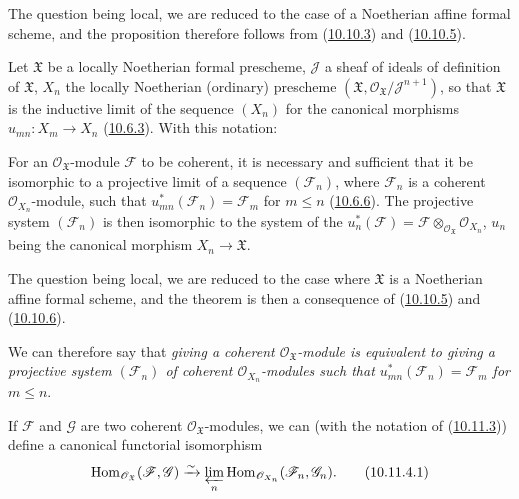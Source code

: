 The question being local, we are reduced to the case of a Noetherian
affine formal scheme, and the proposition therefore follows from
(\hyperref[I.10.10.3]{10.10.3}) and
(\hyperref[I.10.10.5]{10.10.5}).

\begin{env}[10.11.2]
\label{I.10.11.2}
Let $\mathfrak{X}$ be a locally Noetherian formal prescheme,
$\mathscr{J}$ a sheaf of ideals of definition of $\mathfrak{X}$,
$X_n$ the locally Noetherian (ordinary) prescheme
$(\mathfrak{X},\mathscr{O}_{\mathfrak{X}}/\mathscr{J}^{n+1})$, so
that $\mathfrak{X}$ is the inductive limit of the sequence $(X_n)$ for
the canonical morphisms $u_{mn}:X_m\to X_n$
(\hyperref[I.10.6.3]{10.6.3}). With this notation:
\end{env}

\begin{theorem}[10.11.3]
\label{I.10.11.3}
For an $\mathscr{O}_{\mathfrak{X}}$-module $\mathscr{F}$ to be
coherent, it is necessary and sufficient that it be isomorphic to a
projective limit of a sequence $(\mathscr{F}_n)$, where $\mathscr{F}_n$ is a
coherent $\mathscr{O}_{X_n}$-module, such that
$u_{mn}^*(\mathscr{F}_n)=\mathscr{F}_m$ for $m\leq n$
(\hyperref[I.10.6.6]{10.6.6}). The projective system
$(\mathscr{F}_n)$ is then isomorphic to the system of the
$u_n^*(\mathscr{F})=\mathscr{F}
\otimes_{\mathscr{O}_{\mathfrak{X}}}\mathscr{O}_{X_n}$, $u_n$ being
the canonical morphism $X_n\to\mathfrak{X}$.
\end{theorem}

The question being local, we are reduced to the case where $\mathfrak{X}$ is
a Noetherian affine formal scheme, and the theorem is then a consequence
of (\hyperref[I.10.10.5]{10.10.5}) and
(\hyperref[I.10.10.6]{10.10.6}).

We can therefore say that \emph{giving a coherent
$\mathscr{O}_{\mathfrak{X}}$-module is equivalent to giving a
projective system $(\mathscr{F}_n)$ of
coherent $\mathscr{O}_{X_n}$-modules such that
$u_{mn}^*(\mathscr{F}_n)=\mathscr{F}_m$ for $m\leq n$}.

\begin{corollary}[10.11.4]
\label{I.10.11.4}
If $\mathscr{F}$ and $\mathscr{G}$ are two coherent
$\mathscr{O}_{\mathfrak{X}}$-modules, we can (with the
notation of (\hyperref[I.10.11.3]{10.11.3})) define a
canonical functorial isomorphism
\[
  \label{I.10.11.4.1}
  \operatorname{Hom}_{\mathscr{O}_{\mathfrak{X}}}
  (\mathscr{F},\mathscr{G})
  \xrightarrow{\sim}
  \varprojlim_n
  \operatorname{Hom}_{\mathscr{O}_{X_n}}
  (\mathscr{F}_n,\mathscr{G}_n).
  \tag{10.11.4.1}
\]
\end{corollary}

